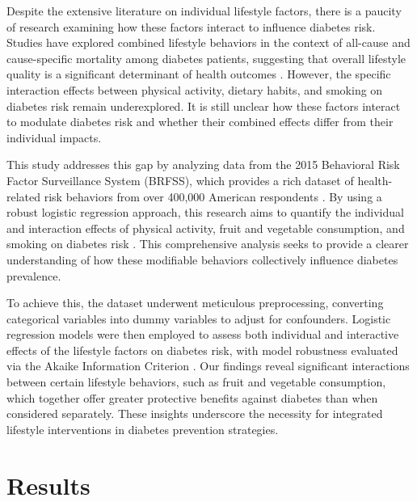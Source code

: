 \documentclass[11pt]{article}
\begin{document}
Despite the extensive literature on individual lifestyle factors, there is a paucity of research examining how these factors interact to influence diabetes risk. Studies have explored combined lifestyle behaviors in the context of all-cause and cause-specific mortality among diabetes patients, suggesting that overall lifestyle quality is a significant determinant of health outcomes \cite{Lin2011ImpactOL, Han2021AssociationOA}. However, the specific interaction effects between physical activity, dietary habits, and smoking on diabetes risk remain underexplored. It is still unclear how these factors interact to modulate diabetes risk and whether their combined effects differ from their individual impacts.

This study addresses this gap by analyzing data from the 2015 Behavioral Risk Factor Surveillance System (BRFSS), which provides a rich dataset of health-related risk behaviors from over 400,000 American respondents \cite{Frankenfeld2015DiabetesOA}. By using a robust logistic regression approach, this research aims to quantify the individual and interaction effects of physical activity, fruit and vegetable consumption, and smoking on diabetes risk \cite{Mortensen2022DeterminantsOP}. This comprehensive analysis seeks to provide a clearer understanding of how these modifiable behaviors collectively influence diabetes prevalence.

To achieve this, the dataset underwent meticulous preprocessing, converting categorical variables into dummy variables to adjust for confounders. Logistic regression models were then employed to assess both individual and interactive effects of the lifestyle factors on diabetes risk, with model robustness evaluated via the Akaike Information Criterion \cite{Hayes2009ComputationalPF}. Our findings reveal significant interactions between certain lifestyle behaviors, such as fruit and vegetable consumption, which together offer greater protective benefits against diabetes than when considered separately. These insights underscore the necessity for integrated lifestyle interventions in diabetes prevention strategies.

\section*{Results}
\end{document}
